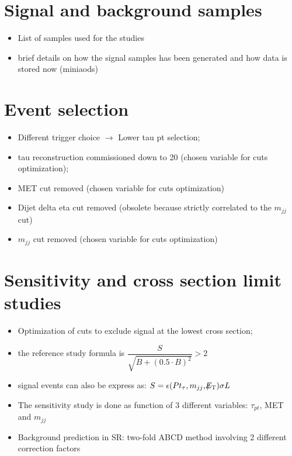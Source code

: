

\section{Signal and background samples}

\begin{itemize}
	\item List of samples used for the studies
	\item brief details on how the signal samples has been generated and how data is stored now (miniaods)
	
\end{itemize}

\section{Event selection}

\begin{itemize}
	\item Different trigger choice $\rightarrow$  Lower tau pt selection;
	\item tau reconstruction commissioned down to 20 \gev (chosen variable for cuts optimization);
	\item MET cut removed (chosen variable for cuts optimization)
	\item Dijet delta eta cut removed (obsolete because strictly correlated to the $m_{jj}$ cut) 
	\item $m_{jj}$ cut removed (chosen variable for cuts optimization)
\end{itemize}

\section{Sensitivity and cross section limit studies}

\begin{itemize}
	\item Optimization of cuts to exclude signal at the lowest cross section;
	\item the reference study formula is $\dfrac{S}{\sqrt{B + (0.5 \cdot B)^{2}}} > 2$
	\item signal events can also be express as: $S = \epsilon ( Pt_{\tau} , m_{jj} ,  \slash\mkern-12mu{E}_{\text{T}} )\sigma L$
	\item The sensitivity study is done as function of 3 different variables: $\tau_{pt}$, MET and $m_{jj}$
	\item Background prediction in SR: two-fold ABCD method involving 2 different correction factors
\end{itemize}

